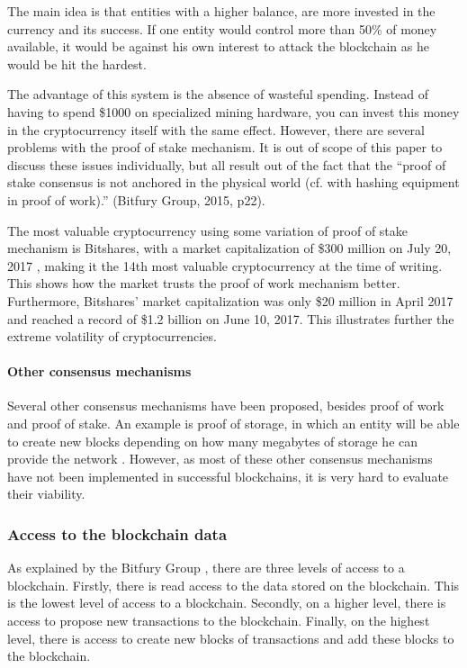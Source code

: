 The main idea is that entities with a higher balance, are more invested in the currency and its success. If one entity would control more than 50\% of money available, it would be against his own interest to attack the blockchain as he would be hit the hardest. 

The advantage of this system is the absence of wasteful spending. Instead of having to spend \$1000 on specialized mining hardware, you can invest this money in the cryptocurrency itself with the same effect. However, there are several problems with the proof of stake mechanism. It is out of scope of this paper to discuss these issues individually, but all result out of the fact that the ``proof of stake consensus is not anchored in the physical world (cf. with hashing equipment in proof of work).'' (Bitfury Group, 2015, p22). 

The most valuable cryptocurrency using some variation of proof of stake mechanism is Bitshares, with a market capitalization of \$300 million on July 20, 2017 \cite{general-market-cap}, making it the 14th most valuable cryptocurrency at the time of writing. This shows how the market trusts the proof of work mechanism better. Furthermore, Bitshares' market capitalization was only \$20 million in April 2017 and reached a record of \$1.2 billion on June 10, 2017. This illustrates further the extreme volatility of cryptocurrencies.

\paragraph{Other consensus mechanisms}

Several other consensus mechanisms have been proposed, besides proof of work and proof of stake. An example is proof of storage, in which an entity will be able to create new blocks depending on how many megabytes of storage he can provide the network \cite{proof-of-whatever}. However, as most of these other consensus mechanisms have not been implemented in successful blockchains, it is very hard to evaluate their viability. 

\subsubsection{Access to the blockchain data}

As explained by the Bitfury Group \cite{bitfury-permissioned}, there are three levels of access to a blockchain. Firstly, there is read access to the data stored on the blockchain. This is the lowest level of access to a blockchain. Secondly, on a higher level, there is access to propose new transactions to the blockchain. Finally, on the highest level, there is access to create new blocks of transactions and add these blocks to the blockchain.


